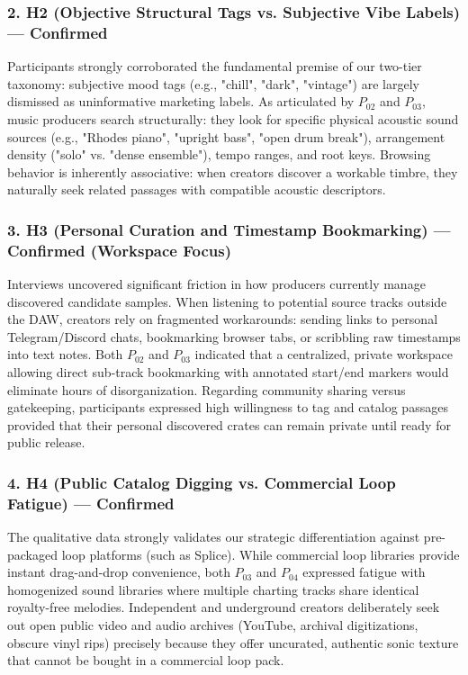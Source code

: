 \subsubsection*{2. H2 (Objective Structural Tags vs. Subjective Vibe Labels) --- Confirmed}
Participants strongly corroborated the fundamental premise of our two-tier taxonomy: subjective mood tags (e.g., "chill", "dark", "vintage") are largely dismissed as uninformative marketing labels. As articulated by $P_{02}$ and $P_{03}$, music producers search structurally: they look for specific physical acoustic sound sources (e.g., "Rhodes piano", "upright bass", "open drum break"), arrangement density ("solo" vs. "dense ensemble"), tempo ranges, and root keys. Browsing behavior is inherently associative: when creators discover a workable timbre, they naturally seek related passages with compatible acoustic descriptors.

\subsubsection*{3. H3 (Personal Curation and Timestamp Bookmarking) --- Confirmed (Workspace Focus)}
Interviews uncovered significant friction in how producers currently manage discovered candidate samples. When listening to potential source tracks outside the DAW, creators rely on fragmented workarounds: sending links to personal Telegram/Discord chats, bookmarking browser tabs, or scribbling raw timestamps into text notes. Both $P_{02}$ and $P_{03}$ indicated that a centralized, private workspace allowing direct sub-track bookmarking with annotated start/end markers would eliminate hours of disorganization. Regarding community sharing versus gatekeeping, participants expressed high willingness to tag and catalog passages provided that their personal discovered crates can remain private until ready for public release.

\subsubsection*{4. H4 (Public Catalog Digging vs. Commercial Loop Fatigue) --- Confirmed}
The qualitative data strongly validates our strategic differentiation against pre-packaged loop platforms (such as Splice). While commercial loop libraries provide instant drag-and-drop convenience, both $P_{03}$ and $P_{04}$ expressed fatigue with homogenized sound libraries where multiple charting tracks share identical royalty-free melodies. Independent and underground creators deliberately seek out open public video and audio archives (YouTube, archival digitizations, obscure vinyl rips) precisely because they offer uncurated, authentic sonic texture that cannot be bought in a commercial loop pack.

